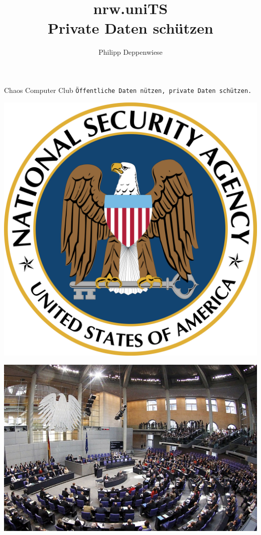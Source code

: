 \documentclass[xetex,mathserif,serif]{beamer}
\title{\textbf{nrw.uniTS}\\ Private Daten schützen}
\author{Philipp Deppenwiese}
\begin{document}
	\frame{\titlepage}
	\begin{frame}
		\begin{block}{Chaos Computer Club}
			\texttt{Öffentliche Daten nützen, private Daten schützen.}
		\end{block}
	\end{frame}	
	
	\begin{frame}
	\includegraphics[scale=0.1]{./nsa.png}
	\end{frame}
	
	\begin{frame}
	\includegraphics[scale=0.3]{./bundestag.jpg}
	\end{frame}
	
\end{document}
